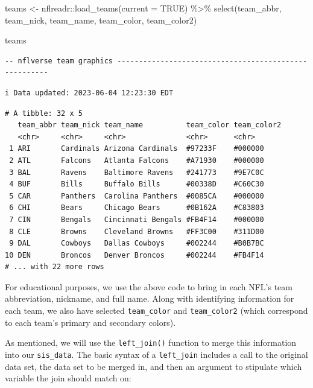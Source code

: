 \documentclass[
  letterpaper,
]{krantz}
\newenvironment{Shaded}{\begin{snugshade}}{\end{snugshade}}
\newcommand{\AttributeTok}[1]{\textcolor[rgb]{0.40,0.45,0.13}{#1}}
\newcommand{\ConstantTok}[1]{\textcolor[rgb]{0.56,0.35,0.01}{#1}}
\newcommand{\FunctionTok}[1]{\textcolor[rgb]{0.28,0.35,0.67}{#1}}
\newcommand{\NormalTok}[1]{\textcolor[rgb]{0.00,0.23,0.31}{#1}}
\newcommand{\OtherTok}[1]{\textcolor[rgb]{0.00,0.23,0.31}{#1}}
\newcommand{\SpecialCharTok}[1]{\textcolor[rgb]{0.37,0.37,0.37}{#1}}
\begin{document}
\begin{Shaded}
\begin{Highlighting}[]
\NormalTok{teams }\OtherTok{\textless{}{-}}\NormalTok{ nflreadr}\SpecialCharTok{::}\FunctionTok{load\_teams}\NormalTok{(}\AttributeTok{current =} \ConstantTok{TRUE}\NormalTok{) }\SpecialCharTok{\%\textgreater{}\%}
  \FunctionTok{select}\NormalTok{(team\_abbr, team\_nick, team\_name, team\_color, team\_color2)}

\NormalTok{teams}
\end{Highlighting}
\end{Shaded}

\begin{verbatim}
-- nflverse team graphics ------------------------------------------------------
\end{verbatim}

\begin{verbatim}
i Data updated: 2023-06-04 12:23:30 EDT
\end{verbatim}

\begin{verbatim}
# A tibble: 32 x 5
   team_abbr team_nick team_name          team_color team_color2
   <chr>     <chr>     <chr>              <chr>      <chr>      
 1 ARI       Cardinals Arizona Cardinals  #97233F    #000000    
 2 ATL       Falcons   Atlanta Falcons    #A71930    #000000    
 3 BAL       Ravens    Baltimore Ravens   #241773    #9E7C0C    
 4 BUF       Bills     Buffalo Bills      #00338D    #C60C30    
 5 CAR       Panthers  Carolina Panthers  #0085CA    #000000    
 6 CHI       Bears     Chicago Bears      #0B162A    #C83803    
 7 CIN       Bengals   Cincinnati Bengals #FB4F14    #000000    
 8 CLE       Browns    Cleveland Browns   #FF3C00    #311D00    
 9 DAL       Cowboys   Dallas Cowboys     #002244    #B0B7BC    
10 DEN       Broncos   Denver Broncos     #002244    #FB4F14    
# ... with 22 more rows
\end{verbatim}

For educational purposes, we use the above code to bring in each NFL's
team abbreviation, nickname, and full name. Along with identifying
information for each team, we also have selected \texttt{team\_color}
and \texttt{team\_color2} (which correspond to each team's primary and
secondary colors).

As mentioned, we will use the \texttt{left\_join()} function to merge
this information into our \texttt{sis\_data}. The basic syntax of a
\texttt{left\_join} includes a call to the original data set, the data
set to be merged in, and then an argument to stipulate which variable
the join should match on:
\end{document}

